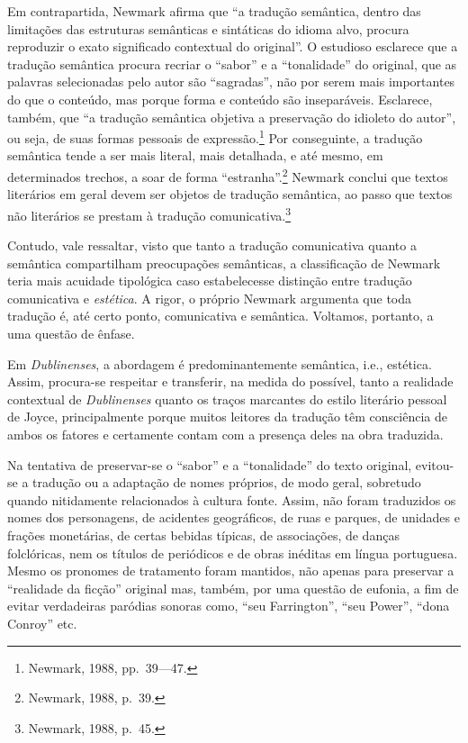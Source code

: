 Em contrapartida, Newmark afirma que “a tradução semântica, dentro das
limitações das estruturas semânticas e sintáticas do idioma alvo, procura
reproduzir o exato significado contextual do original”. O estudioso esclarece
que a tradução semântica procura recriar o “sabor” e a “tonalidade” do
original, que as palavras selecionadas pelo autor são “sagradas”, não por serem
mais importantes do que o conteúdo, mas porque forma e conteúdo são
inseparáveis. Esclarece, também, que “a tradução semântica objetiva a
preservação do idioleto do autor”, ou seja, de suas formas pessoais de
expressão.\footnote{ Newmark, 1988, pp.~39---47.} Por conseguinte, a tradução semântica
tende a ser mais literal, mais detalhada, e até mesmo, em determinados trechos,
a soar de forma “estranha”.\footnote{ Newmark, 1988, p.~39.} Newmark conclui que textos literários
em geral devem ser objetos de tradução semântica, ao passo que textos não
literários se prestam à tradução comunicativa.\footnote{ Newmark, 1988, p.~45.}

Contudo, vale ressaltar, visto que tanto a tradução comunicativa quanto a
semântica compartilham preocupações semânticas, a classificação de Newmark
teria mais acuidade tipológica caso estabelecesse distinção entre tradução
comunicativa e \textit{estética}.  A rigor, o próprio Newmark argumenta que
toda tradução é, até certo ponto, comunicativa e semântica. Voltamos, portanto,
a uma questão de ênfase.

Em \textit{Dublinenses}, a abordagem é predominantemente semântica, i.e.,
estética. Assim, procura-se respeitar e transferir, na medida do possível,
tanto a realidade contextual de \textit{Dublinenses} quanto os traços marcantes
do estilo literário pessoal de Joyce, principalmente porque muitos leitores da
tradução têm consciência de ambos os fatores e certamente contam com a presença
deles na obra traduzida.

Na tentativa de preservar-se o “sabor” e a “tonalidade” do texto original,
evitou-se a tradução ou a adaptação de nomes próprios, de modo geral, sobretudo
quando nitidamente relacionados à cultura fonte. Assim, não foram traduzidos os
nomes dos personagens, de acidentes geográficos, de ruas e parques, de unidades
e frações monetárias, de certas bebidas típicas, de associações, de danças
folclóricas, nem os títulos de periódicos e de obras inéditas em língua
portuguesa. Mesmo os pronomes de tratamento foram mantidos, não apenas para
preservar a “realidade da ficção” original mas, também, por uma questão de
eufonia, a fim de evitar verdadeiras paródias sonoras como, “seu Farrington”,
“seu Power”, “dona Conroy” etc.

